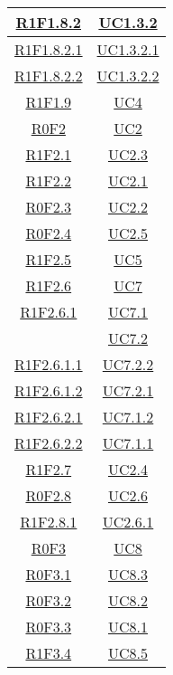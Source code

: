 \begin{longtable}{|c|c|}
\hline
\hyperlink{R1F1.8.2}{R1F1.8.2} & \hyperlink{UC1.3.2}{UC1.3.2}\\
\hline
\hyperlink{R1F1.8.2.1}{R1F1.8.2.1} & \hyperlink{UC1.3.2.1}{UC1.3.2.1}\\
\hline
\hyperlink{R1F1.8.2.2}{R1F1.8.2.2} & \hyperlink{UC1.3.2.2}{UC1.3.2.2}\\
\hline
\hyperlink{R1F1.9}{R1F1.9} & \hyperlink{UC4}{UC4}\\
\hline
\hyperlink{R0F2}{R0F2} & \hyperlink{UC2}{UC2}\\
\hline
\hyperlink{R1F2.1}{R1F2.1} & \hyperlink{UC2.3}{UC2.3}\\
\hline
\hyperlink{R1F2.2}{R1F2.2} & \hyperlink{UC2.1}{UC2.1}\\
\hline
\hyperlink{R0F2.3}{R0F2.3} & \hyperlink{UC2.2}{UC2.2}\\
\hline
\hyperlink{R0F2.4}{R0F2.4} & \hyperlink{UC2.5}{UC2.5}\\
\hline
\hyperlink{R1F2.5}{R1F2.5} & \hyperlink{UC5}{UC5}\\
\hline
\hyperlink{R1F2.6}{R1F2.6} & \hyperlink{UC7}{UC7}\\
\hline
\hyperlink{R1F2.6.1}{R1F2.6.1} & \hyperlink{UC7.1}{UC7.1}\\
& \hyperlink{UC7.2}{UC7.2}\\
\hline
\hyperlink{R1F2.6.1.1}{R1F2.6.1.1} & \hyperlink{UC7.2.2}{UC7.2.2}\\
\hline
\hyperlink{R1F2.6.1.2}{R1F2.6.1.2} & \hyperlink{UC7.2.1}{UC7.2.1}\\
\hline
\hyperlink{R1F2.6.2.1}{R1F2.6.2.1} & \hyperlink{UC7.1.2}{UC7.1.2}\\
\hline
\hyperlink{R1F2.6.2.2}{R1F2.6.2.2} & \hyperlink{UC7.1.1}{UC7.1.1}\\
\hline
\hyperlink{R1F2.7}{R1F2.7} & \hyperlink{UC2.4}{UC2.4}\\
\hline
\hyperlink{R0F2.8}{R0F2.8} & \hyperlink{UC2.6}{UC2.6}\\
\hline
\hyperlink{R1F2.8.1}{R1F2.8.1} & \hyperlink{UC2.6.1}{UC2.6.1}\\
\hline
\hyperlink{R0F3}{R0F3} & \hyperlink{UC8}{UC8}\\
\hline
\hyperlink{R0F3.1}{R0F3.1} & \hyperlink{UC8.3}{UC8.3}\\
\hline
\hyperlink{R0F3.2}{R0F3.2} & \hyperlink{UC8.2}{UC8.2}\\
\hline
\hyperlink{R0F3.3}{R0F3.3} & \hyperlink{UC8.1}{UC8.1}\\
\hline
\hyperlink{R1F3.4}{R1F3.4} & \hyperlink{UC8.5}{UC8.5}\\

\end{longtable}

